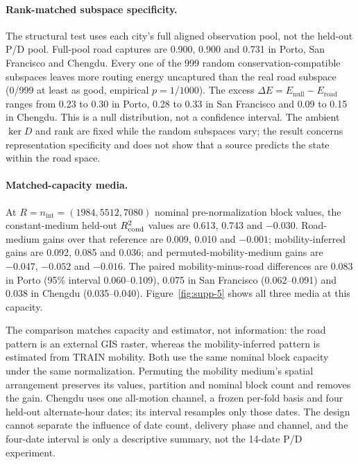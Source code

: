 
\paragraph{Rank-matched subspace specificity.} The structural test uses each city's full aligned observation pool, not the held-out P/D pool. Full-pool road captures are 0.900, 0.900 and 0.731 in Porto, San Francisco and Chengdu. Every one of the 999 random conservation-compatible subspaces leaves more routing energy uncaptured than the real road subspace (0/999 at least as good, empirical $p=1/1000$). The excess $\Delta E=E_{\mathrm{null}}-E_{\mathrm{road}}$ ranges from 0.23 to 0.30 in Porto, 0.28 to 0.33 in San Francisco and 0.09 to 0.15 in Chengdu. This is a null distribution, not a confidence interval. The ambient $\ker D$ and rank are fixed while the random subspaces vary; the result concerns representation specificity and does not show that a source predicts the state within the road space.

\paragraph{Matched-capacity media.} At $R=n_{\mathrm{int}}=(1984,5512,7080)$ nominal pre-normalization block values, the constant-medium held-out $R^{2}_{\mathrm{cond}}$ values are 0.613, 0.743 and $-0.030$. Road-medium gains over that reference are 0.009, 0.010 and $-0.001$; mobility-inferred gains are 0.092, 0.085 and 0.036; and permuted-mobility-medium gains are $-0.047$, $-0.052$ and $-0.016$. The paired mobility-minus-road differences are 0.083 in Porto (95\% interval 0.060--0.109), 0.075 in San Francisco (0.062--0.091) and 0.038 in Chengdu (0.035--0.040). Figure~\ref{fig:supp-5} shows all three media at this capacity.

The comparison matches capacity and estimator, not information: the road pattern is an external GIS raster, whereas the mobility-inferred pattern is estimated from TRAIN mobility. Both use the same nominal block capacity under the same normalization. Permuting the mobility medium's spatial arrangement preserves its values, partition and nominal block count and removes the gain. Chengdu uses one all-motion channel, a frozen per-fold basis and four held-out alternate-hour dates; its interval resamples only those dates. The design cannot separate the influence of date count, delivery phase and channel, and the four-date interval is only a descriptive summary, not the 14-date P/D experiment.

